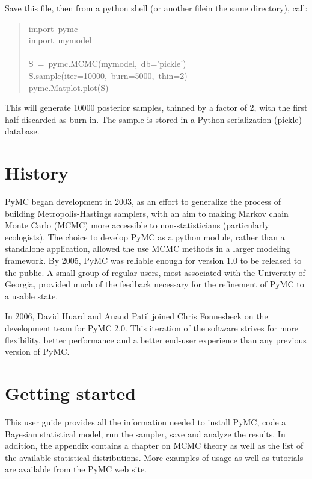 Save this file, then from a python shell (or another filein the same directory), call:
\begin{quote}{\ttfamily \raggedright \noindent
import~pymc~\\
import~mymodel~\\
~\\
S~=~pymc.MCMC(mymodel,~db='pickle')~\\
S.sample(iter=10000,~burn=5000,~thin=2)~\\
pymc.Matplot.plot(S)
}\end{quote}

This will generate 10000 posterior samples, thinned by a factor of 2, with the first half discarded as burn-in. The sample is stored in a Python serialization (pickle) database.



\hypertarget{history}{}
\section{History}
\label{history}

PyMC began development in 2003, as an effort to generalize the process of building Metropolis-Hastings samplers, with an aim to making Markov chain Monte Carlo (MCMC) more accessible to non-statisticians (particularly ecologists). The choice to develop PyMC as a python module, rather than a standalone application, allowed the use MCMC methods in a larger modeling framework. By 2005, PyMC was reliable enough for version 1.0 to be released to the public. A small group of regular users, most associated with the University of Georgia, provided much of the feedback necessary for the refinement of PyMC to a usable state.

In 2006, David Huard and Anand Patil joined Chris Fonnesbeck on the development team for PyMC 2.0. This iteration of the software strives for more flexibility, better performance and a better end-user experience than any previous version of PyMC.



\hypertarget{getting-started}{}
\section{Getting started}
\label{getting-started}

This user guide provides all the information needed to install PyMC, code
a Bayesian statistical model, run the sampler, save and analyze the results.
In addition, the appendix contains a chapter on MCMC theory as well as the list of the
available statistical distributions. More \href{http://code.google.com/p/pymc/}{examples} of usage as well as
\href{http://code.google.com/p/pymc/wiki/TutorialsAndRecipes}{tutorials}  are available from the PyMC web site.



